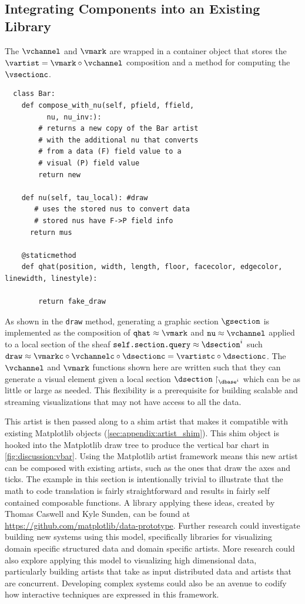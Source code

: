 \documentclass[journal]{IEEEtran}
\theoremstyle{definition}
\theoremstyle{remark}
\begin{document}
\subsection{Integrating Components into an Existing Library}
The $\vchannel$ and $\vmark$ are wrapped in a container object that stores the $\vartist = \vmark \circ \vchannel$ composition and a method for computing the $\vsectionc$.
\begin{verbatim}
  class Bar:
    def compose_with_nu(self, pfield, ffield,
          nu, nu_inv:):
        # returns a new copy of the Bar artist
        # with the additional nu that converts
        # from a data (F) field value to a
        # visual (P) field value
        return new

    def nu(self, tau_local): #draw
       # uses the stored nus to convert data
       # stored nus have F->P field info
      return mus

    @staticmethod
    def qhat(position, width, length, floor, facecolor, edgecolor, linewidth, linestyle):

        return fake_draw
\end{verbatim}

As shown in the \texttt{draw} method, generating a graphic section $\gsection$ is implemented as the composition of $\texttt{qhat} \approx \vmark$ and $\texttt{nu} \approx \vchannel$ applied to a local section of the sheaf $\texttt{self.section.query} \approx \dsection^{i}$ such  $\texttt{draw} \approx \vmarkc\circ\vchannelc\circ\dsectionc  = \vartistc\circ \dsectionc$. The $\vchannel$ and $\vmark$ functions shown here are written such that they can generate a visual element given a local section $\dsection\restriction_{\dbase^{i}}$ which can be as little or large as needed. This flexibility is a prerequisite for building scalable and streaming visualizations that may not have access to all the data.

This artist is then passed along to a shim artist that makes it compatible with existing Matplotlib objects (\autoref{sec:appendix:artist_shim}). This shim object is hooked into the Matplotlib draw tree to produce the vertical bar chart in \autoref{fig:discussion:vbar}. Using the Matplotlib artist framework means this new artist can be composed with existing artists, such as the ones that draw the axes and ticks. The example in this section is intentionally trivial to illustrate that the math to code translation is fairly straightforward and results in fairly self contained composable functions. A library applying these ideas, created by Thomas Caswell and Kyle Sunden, can be found at \url{https://github.com/matplotlib/data-prototype}. Further research could investigate building new systems using this model, specifically libraries for visualizing domain specific structured data and domain specific artists. More research could also explore applying this model to visualizing high dimensional data, particularly building artists that take as input distributed data and artists that are concurrent. Developing complex systems could also be an avenue to codify how interactive techniques are expressed in this framework.
\end{document}

